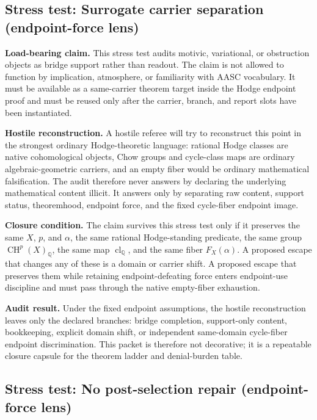 \documentclass[11pt]{article}
\newcommand{\QQ}{\mathbb{Q}}
\newcommand{\CH}{\operatorname{CH}}
\newcommand{\clQ}{\operatorname{cl}_{\QQ}}
\begin{document}
\subsection{Stress test: Surrogate carrier separation (endpoint-force lens)}

\par\noindent\textbf{Load-bearing claim.} This stress test audits motivic, variational, or obstruction objects as bridge support rather than readout. The claim is not allowed to function by implication, atmosphere, or familiarity with AASC vocabulary. It must be available as a same-carrier theorem target inside the Hodge endpoint proof and must be reused only after the carrier, branch, and report slots have been instantiated.

\par\noindent\textbf{Hostile reconstruction.} A hostile referee will try to reconstruct this point in the strongest ordinary Hodge-theoretic language: rational Hodge classes are native cohomological objects, Chow groups and cycle-class maps are ordinary algebraic-geometric carriers, and an empty fiber would be ordinary mathematical falsification. The audit therefore never answers by declaring the underlying mathematical content illicit. It answers only by separating raw content, support status, theoremhood, endpoint force, and the fixed cycle-fiber endpoint image.

\par\noindent\textbf{Closure condition.} The claim survives this stress test only if it preserves the same $X$, $p$, and $\alpha$, the same rational Hodge-standing predicate, the same group $\CH^p(X)_\QQ$, the same map $\clQ$, and the same fiber $F_X(\alpha)$. A proposed escape that changes any of these is a domain or carrier shift. A proposed escape that preserves them while retaining endpoint-defeating force enters endpoint-use discipline and must pass through the native empty-fiber exhaustion.

\par\noindent\textbf{Audit result.} Under the fixed endpoint assumptions, the hostile reconstruction leaves only the declared branches: bridge completion, support-only content, bookkeeping, explicit domain shift, or independent same-domain cycle-fiber endpoint discrimination. This packet is therefore not decorative; it is a repeatable closure capsule for the theorem ladder and denial-burden table.


\subsection{Stress test: No post-selection repair (endpoint-force lens)}
\end{document}
